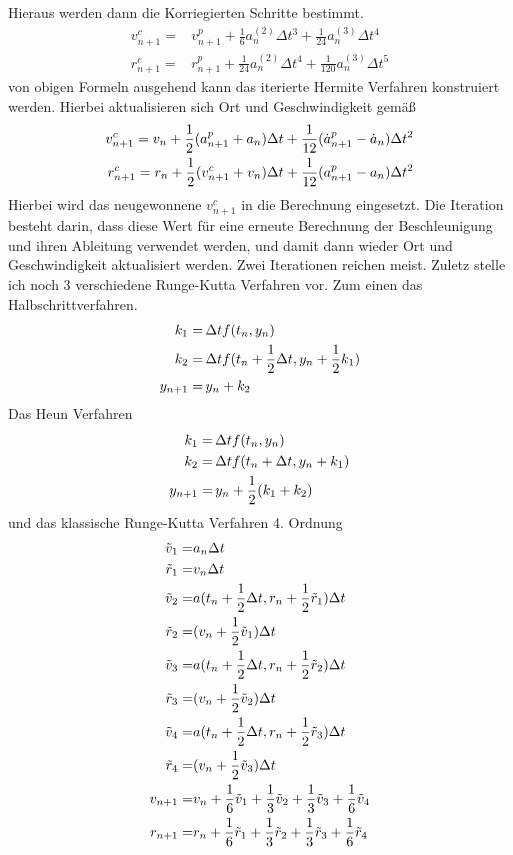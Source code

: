 \documentclass[12pt]{article}
\begin{document}
Hieraus werden dann die Korriegierten Schritte bestimmt.
\begin{align*}
    v_{n+1}^c=&v_{n+1}^p+\frac{1}{6}a_n^{(2)}\Delta{t}^3+\frac{1}{24}a_n^{(3)}\Delta{t}^4\\
    r_{n+1}^c=&r_{n+1}^p+\frac{1}{24}a_n^{(2)}\Delta{t}^4+\frac{1}{120}a_n^{(3)}\Delta{t}^5
\end{align*}
von obigen Formeln ausgehend kann das iterierte Hermite Verfahren konstruiert werden. Hierbei aktualisieren sich Ort und Geschwindigkeit gemäß
\begin{align*}
    v_{n+1}^c=v_n+\frac{1}{2}(a_{n+1}^p+a_n)\Delta{t}+\frac{1}{12}(\dot{a}_{n+1}^p-\dot{a}_n)\Delta{t}^2\\
    r_{n+1}^c=r_n+\frac{1}{2}(v_{n+1}^c+v_n)\Delta{t}+\frac{1}{12}(a_{n+1}^p-a_n)\Delta{t}^2
\end{align*}
Hierbei wird das neugewonnene $v_{n+1}^c$ in die Berechnung eingesetzt. Die Iteration besteht darin, dass diese Wert für eine erneute Berechnung der Beschleunigung und ihren Ableitung  verwendet werden, und damit dann wieder Ort und Geschwindigkeit aktualisiert werden. Zwei Iterationen reichen meist.
Zuletz stelle ich noch 3 verschiedene Runge-Kutta Verfahren vor. Zum einen das Halbschrittverfahren.
\begin{align*}
    k_1=&\,\Delta{t}f(t_n,y_n)\\
    k_2=&\,\Delta{t}f(t_n+\frac{1}{2}\Delta{t},y_n+\frac{1}{2}{k}_1)\\
    y_{n+1}=&\,y_n+k_2
\end{align*}
Das Heun Verfahren
\begin{align*}
    k_1=&\,\Delta{t}f(t_n,y_n)\\
    k_2=&\,\Delta{t}f(t_n+\Delta{t},y_n+{k}_1)\\
    y_{n+1}=&\,y_n+\frac{1}{2}(k_1+k_2)
\end{align*}
und das klassische Runge-Kutta Verfahren 4. Ordnung
\begin{align*}
    \tilde{v}_1=&a_n\Delta{t}\\
    \tilde{r}_1=&v_n\Delta{t}\\
    \tilde{v}_2=&a(t_n+\frac{1}{2}\Delta{t},r_n+\frac{1}{2}\tilde{r}_1)\Delta{t}\\
    \tilde{r}_2=&(v_n+\frac{1}{2}\tilde{v}_1)\Delta{t}\\
    \tilde{v}_3=&a(t_n+\frac{1}{2}\Delta{t},r_n+\frac{1}{2}\tilde{r}_2)\Delta{t}\\
    \tilde{r}_3=&(v_n+\frac{1}{2}\tilde{v}_2)\Delta{t}\\
    \tilde{v}_4=&a(t_n+\frac{1}{2}\Delta{t},r_n+\frac{1}{2}\tilde{r}_3)\Delta{t}\\
    \tilde{r}_4=&(v_n+\frac{1}{2}\tilde{v}_3)\Delta{t}\\
    v_{n+1}=&v_n+\frac{1}{6}\tilde{v}_1+\frac{1}{3}\tilde{v}_2+\frac{1}{3}\tilde{v}_3+\frac{1}{6}\tilde{v}_4\\
    r_{n+1}=&r_n+\frac{1}{6}\tilde{r}_1+\frac{1}{3}\tilde{r}_2+\frac{1}{3}\tilde{r}_3+\frac{1}{6}\tilde{r}_4
\end{align*}
\newpage
\end{document}
